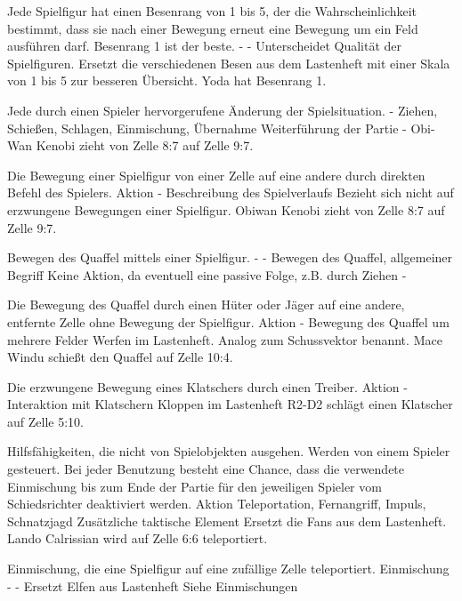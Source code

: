{Jede Spielfigur hat einen Besenrang von 1 bis 5, der die Wahrscheinlichkeit bestimmt, dass sie nach einer Bewegung erneut eine Bewegung um ein Feld ausführen darf. Besenrang 1 ist der beste.}
{-}
{-}
{Unterscheidet Qualität der Spielfiguren.}
{Ersetzt die verschiedenen \glqq{}Besen\grqq{} aus dem Lastenheft mit einer Skala von 1 bis 5 zur besseren Übersicht.}
{Yoda hat Besenrang 1.}

{Jede durch einen Spieler hervorgerufene Änderung der Spielsituation.}
{-}
{Ziehen, Schießen, Schlagen, Einmischung, Übernahme}
{Weiterführung der Partie}
{-}
{Obi-Wan Kenobi zieht von Zelle 8:7 auf Zelle 9:7.}

{Die Bewegung einer Spielfigur von einer Zelle auf eine andere durch direkten Befehl des Spielers.}
{Aktion}
{-}
{Beschreibung des Spielverlaufs}
{Bezieht sich nicht auf erzwungene Bewegungen einer Spielfigur.}
{Obiwan Kenobi zieht von Zelle 8:7 auf Zelle 9:7.}

{Bewegen des Quaffel mittels einer Spielfigur.}
{-}
{-}
{Bewegen des Quaffel, allgemeiner Begriff}
{Keine Aktion, da eventuell eine passive Folge, z.B. durch Ziehen}
{-}

{Die Bewegung des Quaffel durch einen Hüter oder Jäger auf eine andere, entfernte Zelle ohne Bewegung der Spielfigur.}
{Aktion}
{-}
{Bewegung des Quaffel um mehrere Felder}
{\glqq{}Werfen\grqq{}  im Lastenheft. Analog zum Schussvektor benannt.}
{Mace Windu schießt den Quaffel auf Zelle 10:4.}

{Die erzwungene Bewegung eines Klatschers durch einen Treiber.}
{Aktion}
{-}
{Interaktion mit Klatschern}
{\glqq{}Kloppen\grqq{}  im Lastenheft}
{R2-D2 schlägt einen Klatscher auf Zelle 5:10.}

{Hilfsfähigkeiten, die nicht von Spielobjekten ausgehen. Werden von einem Spieler gesteuert. Bei jeder Benutzung besteht eine Chance, dass die verwendete Einmischung bis zum Ende der Partie für den jeweiligen Spieler vom Schiedsrichter deaktiviert werden.}
{Aktion}
{Teleportation, Fernangriff, Impuls, Schnatzjagd}
{Zusätzliche taktische Element}
{Ersetzt die \glqq{}Fans\grqq{}  aus dem Lastenheft.}
{Lando Calrissian wird auf Zelle 6:6 teleportiert.}

{Einmischung, die eine Spielfigur auf eine zufällige Zelle teleportiert.}
{Einmischung}
{-}
{-}
{Ersetzt \glqq{}Elfen\grqq{}  aus Lastenheft}
{Siehe \glqq{}Einmischungen\grqq{} }

